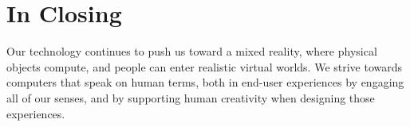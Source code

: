 %
%
\section{In Closing}
Our technology continues to push us toward a mixed reality, where physical objects compute, and people can enter realistic virtual worlds.
We strive towards computers that speak on human terms, both in end-user experiences by engaging all of our senses, and by supporting human creativity when designing those experiences.



\endinput

